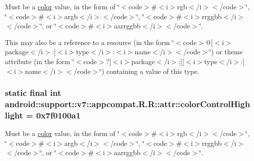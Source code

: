 Must be a \hyperlink{classandroid_1_1support_1_1v7_1_1appcompat_1_1_r_1_1color}{color} value, in the form of \char`\"{}$<$code$>$\#$<$i$>$rgb$<$/i$>$$<$/code$>$\char`\"{}, \char`\"{}$<$code$>$\#$<$i$>$argb$<$/i$>$$<$/code$>$\char`\"{}, \char`\"{}$<$code$>$\#$<$i$>$rrggbb$<$/i$>$$<$/code$>$\char`\"{}, or \char`\"{}$<$code$>$\#$<$i$>$aarrggbb$<$/i$>$$<$/code$>$\char`\"{}. 

This may also be a reference to a resource (in the form \char`\"{}$<$code$>$@\mbox{[}$<$i$>$package$<$/i$>$:\mbox{]}$<$i$>$type$<$/i$>$:$<$i$>$name$<$/i$>$$<$/code$>$\char`\"{}) or theme attribute (in the form \char`\"{}$<$code$>$?\mbox{[}$<$i$>$package$<$/i$>$:\mbox{]}\mbox{[}$<$i$>$type$<$/i$>$:\mbox{]}$<$i$>$name$<$/i$>$$<$/code$>$\char`\"{}) containing a value of this type. \hypertarget{classandroid_1_1support_1_1v7_1_1appcompat_1_1_r_1_1attr_edd6aba8a6e5bba482017d4880d36f0b}{
\subsubsection[{colorControlHighlight}]{\setlength{\rightskip}{0pt plus 5cm}static final int android::support::v7::appcompat.R.R::attr::colorControlHighlight = 0x7f0100a1}}
\label{classandroid_1_1support_1_1v7_1_1appcompat_1_1_r_1_1attr_edd6aba8a6e5bba482017d4880d36f0b}


Must be a \hyperlink{classandroid_1_1support_1_1v7_1_1appcompat_1_1_r_1_1color}{color} value, in the form of \char`\"{}$<$code$>$\#$<$i$>$rgb$<$/i$>$$<$/code$>$\char`\"{}, \char`\"{}$<$code$>$\#$<$i$>$argb$<$/i$>$$<$/code$>$\char`\"{}, \char`\"{}$<$code$>$\#$<$i$>$rrggbb$<$/i$>$$<$/code$>$\char`\"{}, or \char`\"{}$<$code$>$\#$<$i$>$aarrggbb$<$/i$>$$<$/code$>$\char`\"{}. 

